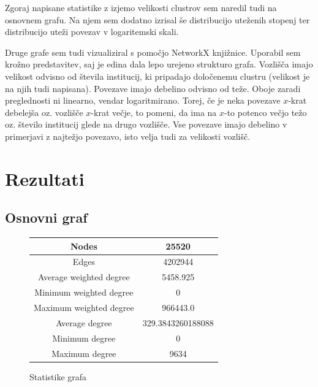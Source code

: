 \documentclass[a4paper,12pt]{article}
\begin{document}
	Zgoraj napisane statistike z izjemo velikosti clustrov sem naredil tudi na osnovnem grafu. Na njem sem dodatno izrisal še distribucijo uteženih stopenj ter distribucijo uteži povezav v logaritemski skali.
	
	Druge grafe sem tudi vizualiziral s pomočjo NetworkX knjižnice. Uporabil sem krožno predstavitev, saj je edina dala lepo urejeno strukturo grafa. Vozlišča imajo velikost odvisno od števila institucij, ki pripadajo določenemu clustru (velikost je na njih tudi napisana). Povezave imajo debelino odvisno od teže. Oboje zaradi preglednosti ni linearno, vendar logaritmirano. Torej, če je neka povezave $x$-krat debelejša oz. vozlišče $x$-krat večje, to pomeni, da ima na $x$-to potenco večjo težo oz. število institucij glede na drugo vozlišče. Vse povezave imajo debelino v primerjavi z najtežjo povezavo, isto velja tudi za velikosti vozlišč.
	
	\section{Rezultati}
	\subsection{Osnovni graf}
		\begin{figure}[H]
		\centering
		\begin{tabular}{ |c|c| } 
			\hline
			Nodes& 25520 \\
			\hline
			Edges& 4202944 \\
			\hline
			Average weighted degree& 5458.925 \\
			Minimum weighted degree& 0 \\
			Maximum weighted degree& 966443.0 \\
			\hline
			Average degree& 329.3843260188088 \\
			Minimum degree& 0 \\ 
			Maximum degree& 9634 \\
			\hline
		\end{tabular}
		\caption{Statistike grafa}
	\end{figure}
\end{document}
